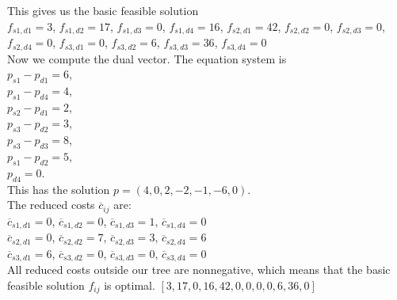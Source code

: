 \documentclass{article}
\theoremstyle{definition}
\begin{document}
This gives us the basic feasible solution \\
$f_{s1,d1} = 3$, $f_{s1,d2} = 17$, $f_{s1,d3} = 0$, $f_{s1,d4} = 16$, $f_{s2,d1} = 42$, $f_{s2,d2} = 0$, $f_{s2,d3} = 0$, $f_{s2,d4} = 0$, $f_{s3,d1} = 0$, $f_{s3,d2} = 6$, $f_{s3,d3} = 36$, $f_{s3,d4} = 0$ \\
Now we compute the dual vector. The equation system is \\
$p_{s1} - p_{d1} = 6$, \\
$p_{s1} - p_{d4} = 4$, \\
$p_{s2} - p_{d1} = 2$, \\
$p_{s3} - p_{d2} = 3$, \\
$p_{s3} - p_{d3} = 8$, \\
$p_{s1} - p_{d2} = 5$, \\
$p_{d4} = 0$. \\
This has the solution $p = (4, 0, 2, -2, -1, -6, 0)$. \\
The reduced costs $\overline{{c}}_{{ij}}$ are: \\
$\overline{c}_{s1,d1} = 0$, $\overline{c}_{s1,d2} = 0$, $\overline{c}_{s1,d3} = 1$, $\overline{c}_{s1,d4} = 0$ \\ 
$\overline{c}_{s2,d1} = 0$, $\overline{c}_{s2,d2} = 7$, $\overline{c}_{s2,d3} = 3$, $\overline{c}_{s2,d4} = 6$ \\ 
$\overline{c}_{s3,d1} = 6$, $\overline{c}_{s3,d2} = 0$, $\overline{c}_{s3,d3} = 0$, $\overline{c}_{s3,d4} = 0$ \\
All reduced costs outside our tree are nonnegative, which means that the basic feasible solution $f_{{ij}}$ is optimal.
$[3, 17, 0, 16, 42, 0, 0, 0, 0, 6, 36, 0]$
\end{document}
